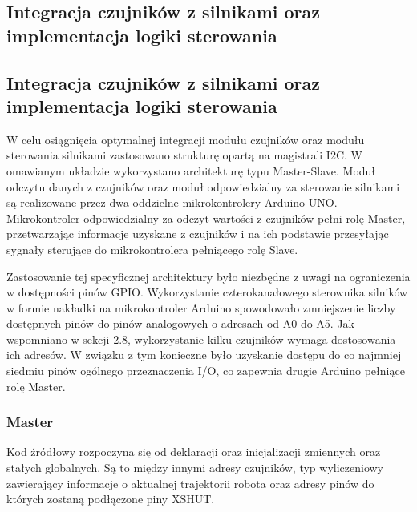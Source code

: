 \documentclass{report}
\begin{document}
\newpage
\subsection{\Large Integracja czujników z silnikami oraz implementacja logiki sterowania}


\newpage
\subsection{\Large Integracja czujników z silnikami oraz implementacja logiki sterowania}
%
%

W celu osiągnięcia optymalnej integracji modułu czujników oraz modułu sterowania silnikami zastosowano strukturę opartą na magistrali I2C. W omawianym układzie wykorzystano architekturę typu Master-Slave. Moduł odczytu danych z czujników oraz moduł odpowiedzialny za sterowanie silnikami są realizowane przez dwa oddzielne mikrokontrolery Arduino UNO. Mikrokontroler odpowiedzialny za odczyt wartości z czujników pełni rolę Master, przetwarzając informacje uzyskane z czujników i na ich podstawie przesyłając sygnały sterujące do mikrokontrolera pełniącego rolę Slave.

Zastosowanie tej specyficznej architektury było niezbędne z uwagi na ograniczenia w dostępności pinów GPIO. Wykorzystanie czterokanałowego sterownika silników w formie nakładki na mikrokontroler Arduino spowodowało zmniejszenie liczby dostępnych pinów do pinów analogowych o adresach od A0 do A5. Jak wspomniano w sekcji 2.8, wykorzystanie kilku czujników wymaga dostosowania ich adresów. W związku z tym konieczne było uzyskanie dostępu do co najmniej siedmiu pinów ogólnego przeznaczenia I/O, co zapewnia drugie Arduino pełniące rolę Master.

\subsubsection{\large Master}

Kod źródłowy rozpoczyna się od deklaracji oraz inicjalizacji zmiennych oraz stałych globalnych. Są to między innymi adresy czujników, typ wyliczeniowy zawierający informacje o aktualnej trajektorii robota oraz adresy pinów do których zostaną podłączone piny XSHUT. 
\end{document}
